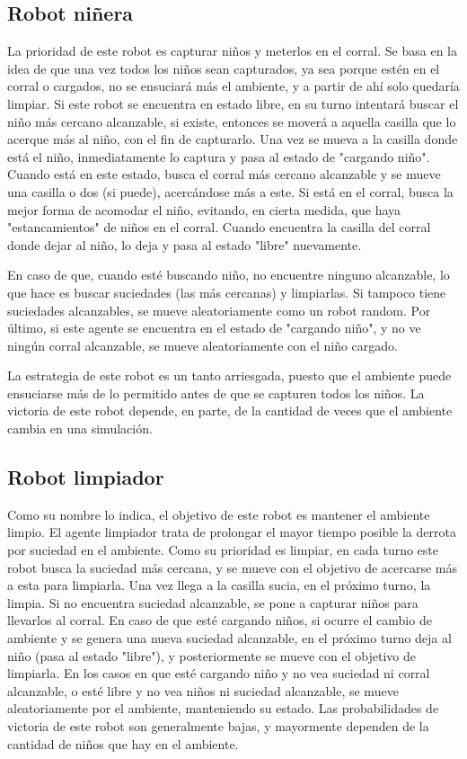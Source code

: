 \documentclass[twoside]{article}
\begin{document}
\subsection{Robot ni\~nera}
La prioridad de este robot es capturar ni\~nos y meterlos en el corral. Se basa en la idea de que una vez todos los ni\~nos sean capturados, ya sea porque est\'en en el corral o cargados, no se ensuciar\'a m\'as el ambiente, y a partir de ah\'i solo quedar\'ia limpiar. Si este robot se encuentra en estado libre, en su turno intentar\'a buscar el ni\~no m\'as cercano alcanzable, si existe, entonces se mover\'a a aquella casilla que lo acerque m\'as al ni\~no, con el fin de capturarlo. Una vez se mueva a la casilla donde est\'a el ni\~no, inmediatamente lo captura y pasa al estado de "cargando ni\~no". Cuando est\'a en este estado, busca el corral m\'as cercano alcanzable y se mueve una casilla o dos (si puede), acerc\'andose m\'as a este. Si est\'a en el corral, busca la mejor forma de acomodar el ni\~no, evitando, en cierta medida, que haya "estancamientos" de ni\~nos en el corral. Cuando encuentra la casilla del corral donde dejar al ni\~no, lo deja y pasa al estado "libre" nuevamente.

En caso de que, cuando est\'e buscando ni\~no, no encuentre ninguno alcanzable, lo que hace es buscar suciedades (las m\'as cercanas) y limpiarlas. Si tampoco tiene suciedades alcanzables, se mueve aleatoriamente como un robot random. Por \'ultimo, si este agente se encuentra en el estado de "cargando ni\~no", y no ve ning\'un corral alcanzable, se mueve aleatoriamente con el ni\~no cargado.

La estrategia de este robot es un tanto arriesgada, puesto que el ambiente puede ensuciarse m\'as de lo permitido antes de que se capturen todos los ni\~nos. La victoria de este robot depende, en parte, de la cantidad de veces que el ambiente cambia en una simulaci\'on.

\subsection{Robot limpiador}
Como su nombre lo indica, el objetivo de este robot es mantener el ambiente limpio. El agente limpiador trata de prolongar el mayor tiempo posible la derrota por suciedad en el ambiente. Como su prioridad es limpiar, en cada turno este robot busca la suciedad m\'as cercana, y se mueve con el objetivo de acercarse m\'as a esta para limpiarla. Una vez llega a la casilla sucia, en el pr\'oximo turno, la limpia. Si no encuentra suciedad alcanzable, se pone a capturar ni\~nos para llevarlos al corral. En caso de que est\'e cargando ni\~nos, si ocurre el cambio de ambiente y se genera una nueva suciedad alcanzable, en el pr\'oximo turno deja al ni\~no (pasa al estado "libre"), y posteriormente se mueve con el objetivo de limpiarla. En los casos en que est\'e cargando ni\~no y no vea suciedad ni corral alcanzable, o est\'e libre y no vea ni\~nos ni suciedad alcanzable, se mueve aleatoriamente por el ambiente, manteniendo su estado. Las probabilidades de victoria de este robot son generalmente bajas, y mayormente dependen de la cantidad de ni\~nos que hay en el ambiente.
\end{document}
